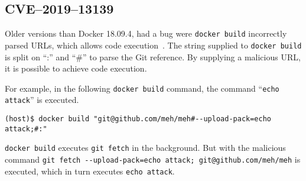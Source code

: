 \subsection{CVE--2019--13139}\label{CVE-2019-13139}
Older versions than Docker 18.09.4, had a bug were \lstinline{docker build} incorrectly parsed URLs, which allows code execution~\cite{CVE-2019-13139-STAALDRAAD}. The string supplied to \lstinline{docker build} is split on ``:'' and ``\#'' to parse the Git reference. By supplying a malicious URL, it is possible to achieve code execution.

\medskip

For example, in the following \lstinline{docker build} command, the command ``\lstinline{echo attack}'' is executed.

\begin{lstlisting}[caption={\lstinline{docker build} command execution.},captionpos=b]
(host)$ docker build "git@github.com/meh/meh#--upload-pack=echo attack;#:"
\end{lstlisting}

\lstinline{docker build} executes \lstinline{git fetch} in the background. But with the malicious command \lstinline{git fetch --upload-pack=echo attack; git@github.com/meh/meh} is executed, which in turn executes \lstinline{echo attack}.
